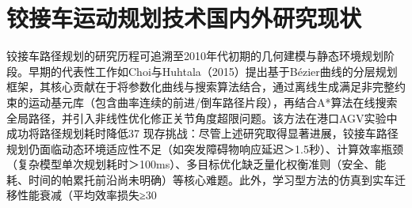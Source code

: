 \documentclass[master,academic]{ysuthesis} %
\begin{document}
	\section{铰接车运动规划技术国内外研究现状}
	铰接车路径规划的研究历程可追溯至2010年代初期的几何建模与静态环境规划阶段。早期的代表性工作如Choi与Huhtala（2015）提出基于Bézier曲线的分层规划框架，其核心贡献在于将参数化曲线与搜索算法结合，通过离线生成满足非完整约束的运动基元库（包含曲率连续的前进/倒车路径片段），再结合A*算法在线搜索全局路径，并引入非线性优化修正关节角度超限问题。该方法在港口AGV实验中成功将路径规划耗时降低37%
	现存挑战：尽管上述研究取得显著进展，铰接车路径规划仍面临动态环境适应性不足（如突发障碍物响应延迟＞1.5秒）、计算效率瓶颈（复杂模型单次规划耗时＞100ms）、多目标优化缺乏量化权衡准则（安全、能耗、时间的帕累托前沿尚未明确）等核心难题。此外，学习型方法的仿真到实车迁移性能衰减（平均效率损失≥30%
\end{document}

